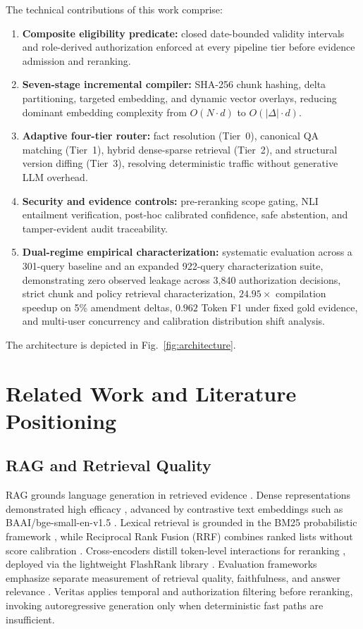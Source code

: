 \documentclass[journal]{IEEEtran}
\newcommand{\sys}{Veritas}
\begin{document}
The technical contributions of this work comprise:
\begin{enumerate}\setlength{\itemsep}{0pt}\setlength{\parsep}{0pt}\setlength{\topsep}{0.5pt}
  \item \textbf{Composite eligibility predicate:} closed date-bounded validity intervals and role-derived authorization enforced at every pipeline tier before evidence admission and reranking.
  \item \textbf{Seven-stage incremental compiler:} SHA-256 chunk hashing, delta partitioning, targeted embedding, and dynamic vector overlays, reducing dominant embedding complexity from $O(N\cdot d)$ to $O(|\Delta|\cdot d)$.
  \item \textbf{Adaptive four-tier router:} fact resolution (Tier~0), canonical QA matching (Tier~1), hybrid dense-sparse retrieval (Tier~2), and structural version diffing (Tier~3), resolving deterministic traffic without generative LLM overhead.
  \item \textbf{Security and evidence controls:} pre-reranking scope gating, NLI entailment verification, post-hoc calibrated confidence, safe abstention, and tamper-evident audit traceability.
  \item \textbf{Dual-regime empirical characterization:} systematic evaluation across a 301-query baseline and an expanded 922-query characterization suite, demonstrating zero observed leakage across 3,840 authorization decisions, strict chunk and policy retrieval characterization, $24.95\times$ compilation speedup on 5\% amendment deltas, $0.962$ Token F1 under fixed gold evidence, and multi-user concurrency and calibration distribution shift analysis.
\end{enumerate}

The architecture is depicted in Fig.~\ref{fig:architecture}.

\section{Related Work and Literature Positioning}

\subsection{RAG and Retrieval Quality}
RAG grounds language generation in retrieved evidence \cite{lewis2020rag}. Dense representations demonstrated high efficacy \cite{karpukhin2020dpr}, advanced by contrastive text embeddings such as BAAI/bge-small-en-v1.5 \cite{xiao2024bge}. Lexical retrieval is grounded in the BM25 probabilistic framework \cite{robertson2009bm25}, while Reciprocal Rank Fusion (RRF) combines ranked lists without score calibration \cite{cormack2009rrf}. Cross-encoders distill token-level interactions for reranking \cite{jiao2020tinybert}, deployed via the lightweight FlashRank library \cite{flashrank}. Evaluation frameworks emphasize separate measurement of retrieval quality, faithfulness, and answer relevance \cite{es2024ragas,saadfalcon2024ares,niu2024ragtruth}. \sys{} applies temporal and authorization filtering before reranking, invoking autoregressive generation only when deterministic fast paths are insufficient.
\end{document}
